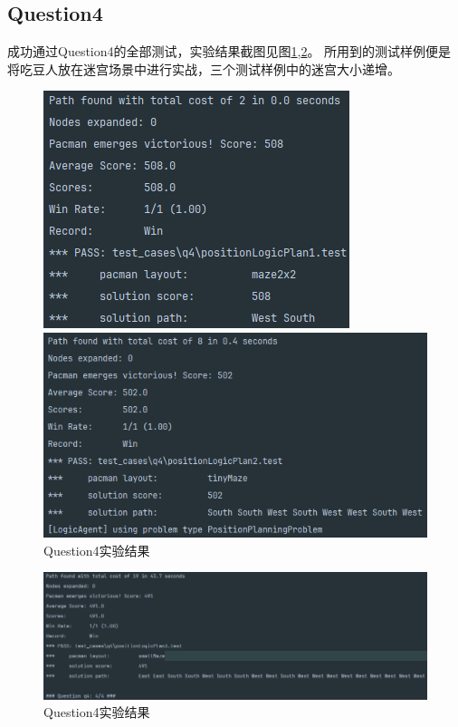 \subsection{Question4}
成功通过Question4的全部测试，实验结果截图见图\ref{q412},\ref{q43}。
所用到的测试样例便是将吃豆人放在迷宫场景中进行实战，三个测试样例中的迷宫大小递增。
\begin{figure}[!htbp]
    \centering
    \begin{minipage}[t]{0.4\textwidth}
    \centering
    \includegraphics[width=\textwidth]{pic/q41.png}
    \end{minipage}
    \begin{minipage}[t]{0.55\textwidth}
    \centering
    \includegraphics[width=\textwidth]{pic/q42.png}
    \end{minipage}
    \caption{Question4实验结果}\label{q412}
\end{figure}
\begin{figure}[htbp]
    \centering
    \includegraphics[width = \textwidth]{pic/q43.png}
    \caption{Question4实验结果}\label{q43}
\end{figure}
